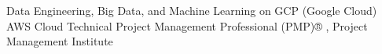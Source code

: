 %
%
%


\begin{scholarship}
					{Data Engineering, Big Data, and Machine Learning on GCP  (Google Cloud)}
					{AWS Cloud Technical}
					{Project Management Professional (PMP)®  ,    Project Management Institute}	
\end{scholarship}
